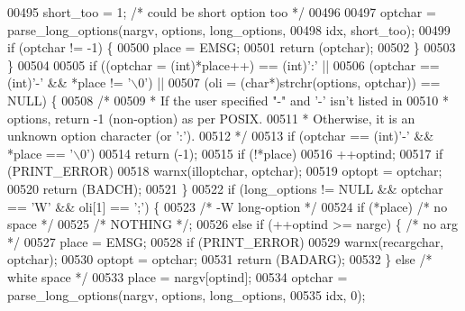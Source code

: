 \begin{DoxyCode}
{{{{{{{00495             short\_too = 1;      \textcolor{comment}{/* could be short option too */}
00496 
00497         optchar = parse_long_options(nargv, options, long\_options,
00498             idx, short\_too);
00499         \textcolor{keywordflow}{if} (optchar != -1) \{
00500             place = EMSG;
00501             \textcolor{keywordflow}{return} (optchar);
00502         \}
00503     \}
00504 
00505     \textcolor{keywordflow}{if} ((optchar = (\textcolor{keywordtype}{int})*place++) == (\textcolor{keywordtype}{int})\textcolor{charliteral}{':'} ||
00506         (optchar == (\textcolor{keywordtype}{int})\textcolor{charliteral}{'-'} && *place != \textcolor{charliteral}{'\(\backslash\)0'}) ||
00507         (oli = (\textcolor{keywordtype}{char}*)strchr(options, optchar)) == NULL) \{
00508         \textcolor{comment}{/*}
00509 \textcolor{comment}{         * If the user specified "-" and  '-' isn't listed in}
00510 \textcolor{comment}{         * options, return -1 (non-option) as per POSIX.}
00511 \textcolor{comment}{         * Otherwise, it is an unknown option character (or ':').}
00512 \textcolor{comment}{         */}
00513         \textcolor{keywordflow}{if} (optchar == (\textcolor{keywordtype}{int})\textcolor{charliteral}{'-'} && *place == \textcolor{charliteral}{'\(\backslash\)0'})
00514             \textcolor{keywordflow}{return} (-1);
00515         \textcolor{keywordflow}{if} (!*place)
00516             ++optind;
00517         \textcolor{keywordflow}{if} (PRINT_ERROR)
00518             warnx(illoptchar, optchar);
00519         optopt = optchar;
00520         \textcolor{keywordflow}{return} (BADCH);
00521     \}
00522     \textcolor{keywordflow}{if} (long\_options != NULL && optchar == \textcolor{charliteral}{'W'} && oli[1] == \textcolor{charliteral}{';'}) \{
00523         \textcolor{comment}{/* -W long-option */}
00524         \textcolor{keywordflow}{if} (*place)         \textcolor{comment}{/* no space */}
00525             \textcolor{comment}{/* NOTHING */};
00526         \textcolor{keywordflow}{else} \textcolor{keywordflow}{if} (++optind >= nargc) \{   \textcolor{comment}{/* no arg */}
00527             place = EMSG;
00528             \textcolor{keywordflow}{if} (PRINT_ERROR)
00529                 warnx(recargchar, optchar);
00530             optopt = optchar;
00531             \textcolor{keywordflow}{return} (BADARG);
00532         \} \textcolor{keywordflow}{else}              \textcolor{comment}{/* white space */}
00533             place = nargv[optind];
00534         optchar = parse_long_options(nargv, options, long\_options,
00535             idx, 0);
}}}}}}}
\end{DoxyCode}
